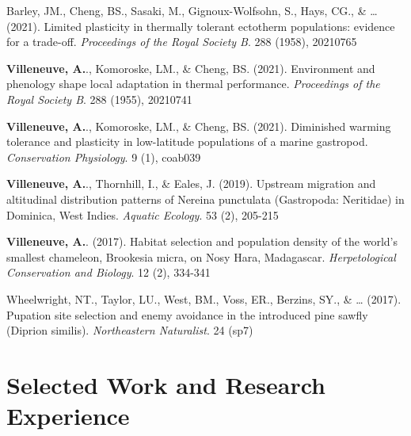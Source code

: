 \documentclass[11pt,a4paper,]{awesome-cv}
\begin{document}
Barley, JM., Cheng, BS., Sasaki, M., Gignoux-Wolfsohn, S., Hays, CG., \&
\ldots{} (2021). Limited plasticity in thermally tolerant ectotherm
populations: evidence for a trade-off. \emph{Proceedings of the Royal
Society B}. 288 (1958), 20210765

\textbf{Villeneuve, A.}., Komoroske, LM., \& Cheng, BS. (2021).
Environment and phenology shape local adaptation in thermal performance.
\emph{Proceedings of the Royal Society B}. 288 (1955), 20210741

\textbf{Villeneuve, A.}., Komoroske, LM., \& Cheng, BS. (2021).
Diminished warming tolerance and plasticity in low-latitude populations
of a marine gastropod. \emph{Conservation Physiology}. 9 (1), coab039

\textbf{Villeneuve, A.}., Thornhill, I., \& Eales, J. (2019). Upstream
migration and altitudinal distribution patterns of Nereina punctulata
(Gastropoda: Neritidae) in Dominica, West Indies. \emph{Aquatic
Ecology}. 53 (2), 205-215

\textbf{Villeneuve, A.}. (2017). Habitat selection and population
density of the world's smallest chameleon, Brookesia micra, on Nosy
Hara, Madagascar. \emph{Herpetological Conservation and Biology}. 12
(2), 334-341

Wheelwright, NT., Taylor, LU., West, BM., Voss, ER., Berzins, SY., \&
\ldots{} (2017). Pupation site selection and enemy avoidance in the
introduced pine sawfly (Diprion similis). \emph{Northeastern
Naturalist}. 24 (sp7)

\section{Selected Work and Research
Experience}\label{selected-work-and-research-experience}
\end{document}

